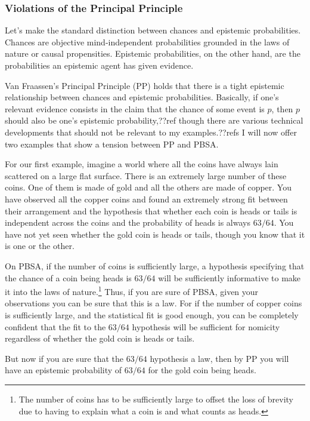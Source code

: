 \subsubsection{Violations of the Principal Principle}\label{sec:principal-principle}
Let's make the standard distinction between chances and epistemic probabilities. Chances are objective mind-independent probabilities 
grounded in the laws of nature or causal propensities. Epistemic probabilities, on the other hand, are the probabilities an epistemic agent 
has given evidence. 

Van Fraassen's Principal Principle (PP) holds that there is a tight epistemic relationship between chances and epistemic 
probabilities. Basically, if one's relevant evidence consists in the claim that the chance of some event is $p$, then $p$ should
also be one's epistemic probability,??ref though there are various technical developments that should not be relevant to my examples.??refs
I will now offer two examples that show a tension between PP and PBSA.

For our first example, imagine a world where all the coins have always lain scattered on a large flat surface. There is an 
extremely large number of these coins. One of them is made of gold and all the others are made of copper. You have observed
all the copper coins and found an extremely strong fit between their arrangement and the hypothesis that whether each coin 
is heads or tails is independent across the coins and the probability of heads is always $63/64$. You have not yet seen whether
the gold coin is heads or tails, though you know that it is one or the other.

On PBSA, if the number of coins is sufficiently large, a hypothesis specifying that the chance of a coin being heads is $63/64$ will 
be sufficiently informative to make it into the laws of nature.\footnote{The number of coins has to be sufficiently large to 
offset the loss of brevity due to having to explain what a coin is and what counts as heads.} Thus, if you are sure of PBSA,
given your observations you can be sure that this is a law. For if the number of copper coins is sufficiently large, and the
statistical fit is good enough, you can be completely confident that the fit to the $63/64$ hypothesis will be sufficient for nomicity regardless of whether the gold coin is heads or tails. 

But now if you are sure that the $63/64$ hypothesis a law, then by PP you will have an epistemic probability of $63/64$ for the gold coin being heads. 

